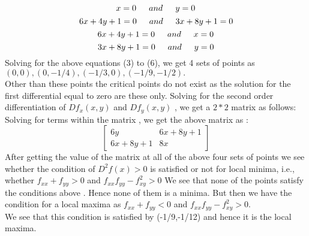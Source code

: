 \documentclass[letterpaper,12pt]{article}
\theoremstyle{definition}
\begin{document}
\begin{equation}
    x = 0 \indent and \indent y = 0
\end{equation}
\begin{equation}
    6x + 4y + 1 = 0\indent and\indent 3x+ 8y+ 1 = 0
\end{equation}
\begin{equation}
    6x +4y +1 = 0\indent and\indent x = 0
\end{equation}
 \begin{equation}
    3x+ 8y +1 = 0\indent and\indent y = 0
 \end{equation}
 \newline
 Solving for the above equations (3) to (6),  we get 4 sets of points as \\ $ (0, 0), (0, -1/4), (-1/3, 0), (-1/9, -1/2).$\\  Other than these points the critical points do not exist as the solution for the first differential equal to zero are these only.
\newline
\doublespacing
Solving for the second order differentiation of $ Df_{x}(x,y)$ and $Df_{y}(x,y)$ , we get a $2  *  2 $ matrix  as follows:
\vspace{2mm}
\newline
Solving for terms within the matrix , we get the above matrix as :
\newline
\begin{equation*}
\left[
\begin{matrix}
6y &6x+8y+1\\
6x+8y+1 &8x
\end{matrix}
\right]
\end{equation*}
\newline
After getting the value of the matrix at all of the above four sets of points we see whether the condition of $D^2f(x) > 0$ is satisfied or not for local minima, i.e., \newline
whether $ f_{xx} + f_{yy} > 0 $  and  $f_{xx}f_{yy} - f_{xy}^2 > 0$
\newline
We see that none of the points satisfy the conditions above . Hence none of them is a minima. But then we have the condition for a local maxima as
$ f_{xx} + f_{yy} < 0 $  and  $f_{xx}f_{yy} - f_{xy}^2 > 0$.\\
We see that this condition is satisfied by (-1/9,-1/12) and hence it is the local maxima.
\end{document}
